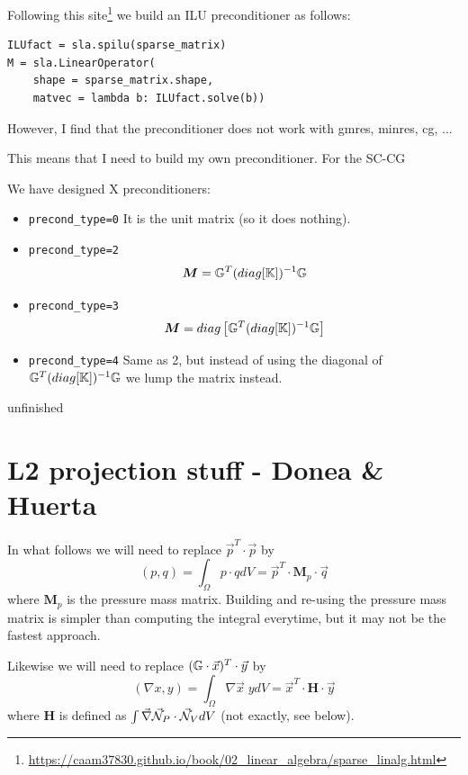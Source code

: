 Following this site\footnote{\url{https://caam37830.github.io/book/02_linear_algebra/sparse_linalg.html}}
we build an ILU preconditioner as follows:
\begin{lstlisting}
ILUfact = sla.spilu(sparse_matrix)
M = sla.LinearOperator(
    shape = sparse_matrix.shape,
    matvec = lambda b: ILUfact.solve(b))
\end{lstlisting}
However, I find that the preconditioner does not work with gmres, minres, cg, ...

This means that I need to build my own preconditioner. 
For the SC-CG 

We have designed X preconditioners:
\begin{itemize}
\item {\tt precond\_type=0} It is the unit matrix (so it does nothing). 

\item {\tt precond\_type=2}
\[
{\bm M} = {\mathbb{G}}^T (diag [{\mathbb{K}}]  )^{-1} {\mathbb{G}} 
\]
\item {\tt precond\_type=3} 
\[
{\bm M} = diag \left[ {\mathbb{G}}^T (diag [{\mathbb{K}}]  )^{-1} {\mathbb{G}} \right]
\]
\item {\tt precond\_type=4} Same as 2, but instead of using the 
diagonal of $ {\mathbb{G}}^T (diag [{\mathbb{K}}]  )^{-1} {\mathbb{G}}$ we lump the matrix instead.

\end{itemize}

{\color{red} \Large unfinished}

\newpage
\section*{L2 projection stuff - Donea \& Huerta}

In what follows we will need to replace $\vec{p}^T\cdot\vec{p}$ 
by 
\[
(p,q) = \int_\Omega {p} \cdot {q} dV 
= \vec{p}^T \cdot {\bm M}_{p} \cdot \vec{q}
\]
where ${\bm M}_{p}$ is the pressure mass matrix. 
Building and re-using the pressure mass matrix is simpler than 
computing the integral everytime, but it may not be 
the fastest approach.

Likewise we will need to replace $( {\mathbb{G}} \cdot \vec{x})^T\cdot \vec{y}$
by
\[
(\nabla {x},{y}) = \int_\Omega \nabla \vec{x} \; {y} dV = \vec{x}^T \cdot {\bm H} \cdot \vec{y}
\]
where ${\bm H}$ is defined as $\int \vec\nabla \vec{{\mathcal{N}}}_P  \cdot \vec{{\mathcal{N}}}_V dV$ (not exactly, see below). 


